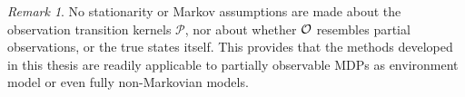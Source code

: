 \documentclass[
    a4paper,
    11pt,
    bibliography=totoc,
    listof=totoc,      
    headinclude=true,
    cleardoublepage=empty,
]{scrbook}
\theoremstyle{plain}
\theoremstyle{definition}
\theoremstyle{remark}
\newtheorem{remark}[theorem]{Remark}
\newcommand{\SetR}{\mathbb R}
\newcommand{\E}{\mathbb E}
\newcommand{\SpaceA}{{\cal A}}
\newcommand{\SpaceO}{{\cal O}}
\newcommand{\SpaceH}{{\cal H}}
\begin{document}

\begin{remark}
    No stationarity or Markov assumptions are made about the observation
    transition kernels $\mathcal{P}$, nor about whether $\SpaceO$ resembles
    partial observations, or the true states itself. This provides that the 
    methods developed in this thesis are readily applicable to partially 
    observable MDPs as environment model or even fully non-Markovian models.
\end{remark}

\end{document}

